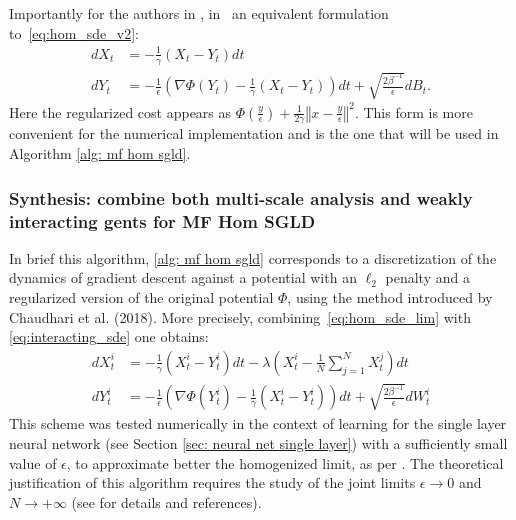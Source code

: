 \documentclass{article}
\begin{document}
Importantly for the authors in \cite{kantas2019sharpflatshallowweakly}, in~\cite{Chaudhari2017DeepRP} an equivalent formulation
to~\ref{eq:hom_sde_v2}: \begin{subequations}\label{eq:hom_sde}
\begin{align}
dX_{t} & =-\frac{1}{\gamma}(X_{t}-Y_{t})dt\label{eq:hom_sde1}\\
dY_{t} & =-\frac{1}{\epsilon}\left(\nabla\Phi(Y_{t})-\frac{1}{\gamma}(X_{t}-Y_{t})\right)dt+\sqrt{\frac{2\beta^{-1}}{\epsilon}}dB_{t}.\label{eq:hom_sde2}
\end{align}
\end{subequations} Here the regularized cost appears as $\Phi(\frac{y}{\epsilon})+\frac{1}{2\gamma}\left\Vert x-\frac{y}{\epsilon}\right\Vert ^{2}$.
This form is more convenient for the numerical implementation and
is the one that will be used in Algorithm \ref{alg: mf hom sgld}.


\subsubsection{Synthesis: combine both multi-scale analysis and weakly interacting gents for MF Hom SGLD}
In brief this algorithm, \ref{alg: mf hom sgld} corresponds to a discretization of the dynamics of gradient descent against a potential with an $ \ell_{2}$ penalty and a regularized version of the original potential $\Phi$, using the method introduced by Chaudhari et al. (2018). More precisely, combining~\ref{eq:hom_sde_lim} with \ref{eq:interacting_sde}
one obtains: 
\begin{align}
dX_{t}^{i} & =-\frac{1}{\gamma}(X_{t}^{i}-Y_{t}^{i})dt-\lambda\left(X_{t}^{i}-\frac{1}{N}\sum_{j=1}^{N}X_{t}^{j}\right)dt\label{eq:hom_mf_sde1}\\
dY_{t}^{i} & =-\frac{1}{\epsilon}\left(\nabla\Phi(Y_{t}^{i})-\frac{1}{\gamma}(X_{t}^{i}-Y_{t}^{i})\right)dt+\sqrt{\frac{2\beta^{-1}}{\epsilon}}dW_{t}^{i}\label{eq:hom_mf_sde2}
\end{align}
This scheme was tested numerically in the context of learning for the single layer neural network (see Section \ref{sec: neural net single layer}) with a sufficiently small value of $\epsilon$,
to approximate better the homogenized limit, as per \cite{kantas2019sharpflatshallowweakly}. The theoretical justification of this algorithm requires the study of the joint limits $\epsilon\rightarrow0$
and $N\rightarrow+\infty$ (see \cite[p. 6]{kantas2019sharpflatshallowweakly} for details and references). \\ 
\end{document}
